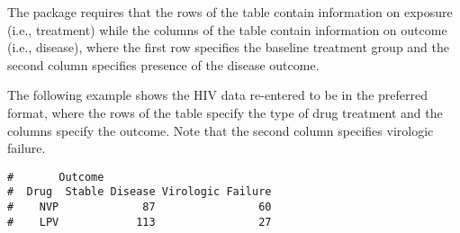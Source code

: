 \documentclass[letterpaper,12pt,twoside,]{pinp}
\begin{document}
\begin{Shaded}
\begin{Highlighting}[]
\NormalTok{(}\NormalTok{)}
\end{Highlighting}
\end{Shaded}

The package requires that the rows of the table contain information on
exposure (i.e., treatment) while the columns of the table contain
information on outcome (i.e., disease), where the first row specifies
the baseline treatment group and the second column specifies presence of
the disease outcome.

The following example shows the HIV data re-entered to be in the
preferred format, where the rows of the table specify the type of drug
treatment and the columns specify the outcome. Note that the second
column specifies virologic failure.

\begin{Shaded}
\begin{Highlighting}[]
\StringTok{ }\NormalTok{(}\NormalTok{(}\NormalTok{, }\NormalTok{, }\NormalTok{, }\NormalTok{),}
                    \NormalTok{, } \NormalTok{, }

\StringTok{ }\NormalTok{(}\NormalTok{ =}\StringTok{ }\NormalTok{(}\NormalTok{, }\NormalTok{),}
                           \NormalTok{ =}\StringTok{ }\NormalTok{(}\NormalTok{, }\NormalTok{))}

\end{Highlighting}
\end{Shaded}

\begin{ShadedResult}
\begin{verbatim}
#       Outcome
#  Drug  Stable Disease Virologic Failure
#    NVP             87                60
#    LPV            113                27
\end{verbatim}
\end{ShadedResult}
\end{document}

